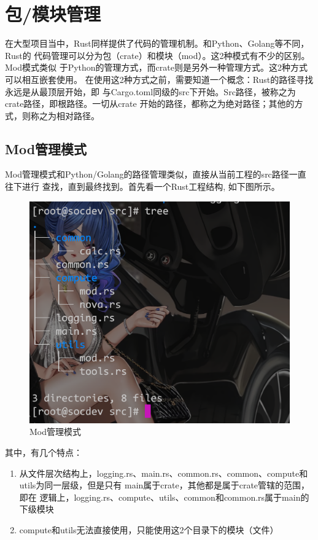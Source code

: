 \section{包/模块管理}
在大型项目当中，Rust同样提供了代码的管理机制。和Python、Golang等不同，Rust的
代码管理可以分为包（crate）和模块（mod）。这2种模式有不少的区别。Mod模式类似
于Python的管理方式，而crate则是另外一种管理方式。这2种方式可以相互嵌套使用。
在使用这2种方式之前，需要知道一个概念：Rust的路径寻找永远是从最顶层开始，即
与Cargo.toml同级的src下开始。Src路径，被称之为crate路径，即根路径。一切从crate
开始的路径，都称之为绝对路径；其他的方式，则称之为相对路径。

\subsection{Mod管理模式}
Mod管理模式和Python/Golang的路径管理类似，直接从当前工程的src路径一直往下进行
查找，直到最终找到。首先看一个Rust工程结构, 如下图所示。
\begin{figure}[H]
  \centering
  \includegraphics[width=\linewidth]{rust_mod.png}
  \caption{Mod管理模式}
  \label{fig:rust_mod}
\end{figure}
其中，有几个特点：
\begin{enumerate}
  \item 从文件层次结构上，logging.rs、main.rs、common.rs、common、compute和
utils为同一层级，但是只有 main属于crate，其他都是属于crate管辖的范围，即在
逻辑上，logging.rs、compute、utils、common和common.rs属于main的下级模块
  \item compute和utils无法直接使用，只能使用这2个目录下的模块（文件）
\end{enumerate}

